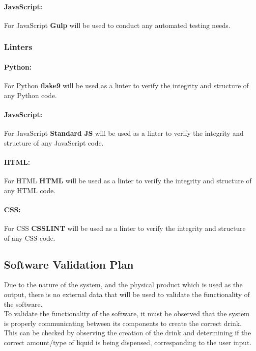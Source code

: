 \documentclass[12pt, titlepage]{article}
\begin{document}
\paragraph{JavaScript:} 
For JavaScript \textbf{Gulp} will be used to conduct any automated testing needs.

\subsubsection{Linters}
\paragraph{Python:}
For Python \textbf{flake9} will be used as a linter to verify the integrity and structure of any Python code.

\paragraph{JavaScript:} 
For JavaScript \textbf{Standard JS} will be used as a linter to verify the integrity and structure of any JavaScript code.

\paragraph{HTML:}
For HTML \textbf{HTML} will be used as a linter to verify the integrity and structure of any HTML code.

\paragraph{CSS:} 
For CSS \textbf{CSSLINT} will be used as a linter to verify the integrity and structure of any CSS code.


\subsection{Software Validation Plan}
Due to the nature of the system, and the physical product which is used as the output, there is no external data that will be used to validate the functionality of the software. \\
\indent To validate the functionality of the software, it must be observed that the system is properly communicating between its components to create the correct drink. This can be checked by observing the creation of the drink and determining if the correct amount/type of liquid is being dispensed, corresponding to the user input.
\end{document}
